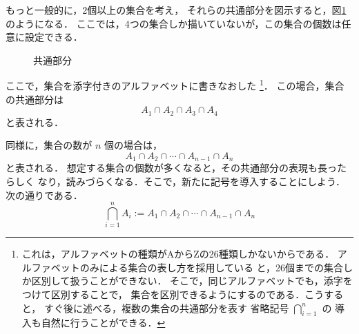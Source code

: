                     もっと一般的に，2個以上の集合を考え，
                    それらの共通部分を図示すると，図\ref{fig:kyoutububun_gen}のようになる．
                    ここでは，4つの集合しか描いていないが，この集合の個数は任意に設定できる．
                        \begin{figure}[hbt]
                            \begin{center}
                                \caption{共通部分}
                                \label{fig:kyoutububun_gen}
                            \end{center}
                        \end{figure}


                    ここで，集合を添字付きのアルファベットに書きなおした
                        \footnote{
                            これは，アルファベットの種類がAからZの26種類しかないからである．
                            アルファベットのみによる集合の表し方を採用している
                            と，26個までの集合しか区別して扱うことができない．
                            そこで，同じアルファベットでも，添字をつけて区別することで，
                            集合を区別できるようにするのである．こうすると，
                            すぐ後に述べる，複数の集合の共通部分を表す
                            省略記号 $\bigcap_{i=1}^{n}$ の
                            導入も自然に行うことができる．
                        }．
                    この場合，集合の共通部分は
                        \begin{equation*}
                            A_{1} \cap A_{2} \cap A_{3} \cap A_{4}
                        \end{equation*}
                    と表される．

                    同様に，集合の数が $n$ 個の場合は，
                        \begin{equation*}
                            A_{1} \cap A_{2} \cap \cdots \cap A_{n-1} \cap A_{n}
                        \end{equation*}
                    と表される．
                    想定する集合の個数が多くなると，その共通部分の表現も長ったらしく
                    なり，読みづらくなる．そこで，新たに記号を導入することにしよう．
                    次の通りである．
                        \begin{equation*}
                            \bigcap_{i=1}^{n} A_{i}
                                :=  A_{1} \cap A_{2} \cap \cdots \cap A_{n-1} \cap A_{n}
                        \end{equation*}

